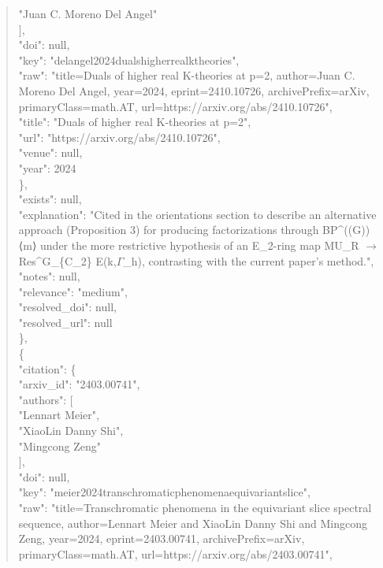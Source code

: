 \documentclass[11pt]{article}
\begin{document}
\begin{quote}
          "Juan C. Moreno Del Angel"\\
        ],\\
        "doi": null,\\
        "key": "delangel2024dualshigherrealktheories",\\
        "raw": "title=Duals of higher real K-theories at p=2, author=Juan C. Moreno Del Angel, year=2024, eprint=2410.10726, archivePrefix=arXiv, primaryClass=math.AT, url=https://arxiv.org/abs/2410.10726",\\
        "title": "Duals of higher real K-theories at p=2",\\
        "url": "https://arxiv.org/abs/2410.10726",\\
        "venue": null,\\
        "year": 2024\\
      \},\\
      "exists": null,\\
      "explanation": "Cited in the orientations section to describe an alternative approach (Proposition 3) for producing factorizations through BP\^{}((G))⟨m⟩ under the more restrictive hypothesis of an E\_2-ring map MU\_R \ensuremath{\to} Res\^{}G\_\{C\_2\} E(k,\ensuremath{\Gamma}\_h), contrasting with the current paper's method.",\\
      "notes": null,\\
      "relevance": "medium",\\
      "resolved\_doi": null,\\
      "resolved\_url": null\\
    \},\\
    \{\\
      "citation": \{\\
        "arxiv\_id": "2403.00741",\\
        "authors": [\\
          "Lennart Meier",\\
          "XiaoLin Danny Shi",\\
          "Mingcong Zeng"\\
        ],\\
        "doi": null,\\
        "key": "meier2024transchromaticphenomenaequivariantslice",\\
        "raw": "title=Transchromatic phenomena in the equivariant slice spectral sequence, author=Lennart Meier and XiaoLin Danny Shi and Mingcong Zeng, year=2024, eprint=2403.00741, archivePrefix=arXiv, primaryClass=math.AT, url=https://arxiv.org/abs/2403.00741",\\

\end{quote}
\end{document}
